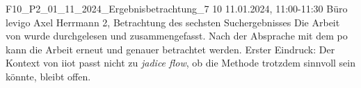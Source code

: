 \fieldnote
{F10\_P2\_01\_11\_2024\_Ergebnisbetrachtung\_7}
{10}
{11.01.2024, 11:00-11:30}
{Büro levigo}
{Axel Herrmann}
{2, Betrachtung des sechsten Suchergebnisses}
{
  Die Arbeit von  wurde durchgelesen und zusammengefasst.
}
{
  Nach der Absprache mit dem \gls{po} kann die Arbeit erneut und genauer betrachtet werden.
}
{
}
{
  Erster Eindruck: Der Kontext von \gls{iiot} passt nicht zu \emph{jadice flow}, ob die Methode trotzdem sinnvoll sein könnte, bleibt offen.
}
{
}
